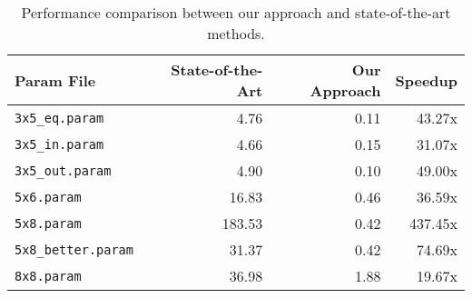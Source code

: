 \begin{table}[h]
\centering
\begin{tabular}{l|r|r|r}
    \textbf{Param File} & \textbf{State-of-the-Art} & \textbf{Our Approach} & \textbf{Speedup} \\
    \hline
    \texttt{3x5\_eq.param} & 4.76 & 0.11 & 43.27x \\
    \texttt{3x5\_in.param} & 4.66 & 0.15 & 31.07x \\
    \texttt{3x5\_out.param} & 4.90 & 0.10 & 49.00x \\
    \texttt{5x6.param} & 16.83 & 0.46 & 36.59x \\
    \texttt{5x8.param} & 183.53 & 0.42 & 437.45x \\
    \texttt{5x8\_better.param} & 31.37 & 0.42 & 74.69x \\
    \texttt{8x8.param} & 36.98 & 1.88 & 19.67x \\
\end{tabular}
\caption{Performance comparison between our approach and state-of-the-art methods.}
\label{tab:performance_comparison}
\end{table}